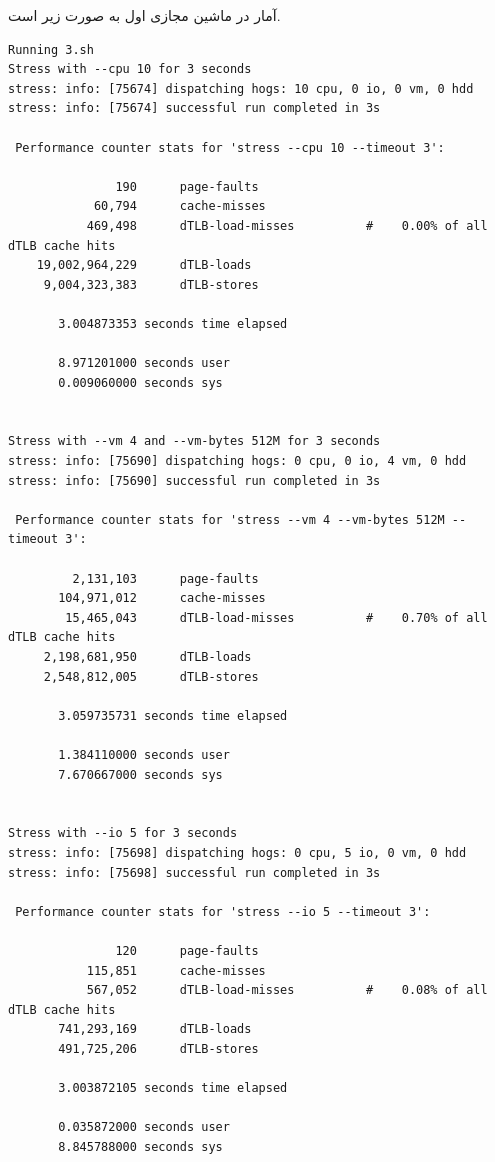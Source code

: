 \documentclass{article}
\begin{document}
آمار در ماشین مجازی اول به صورت زیر است.
\begin{latin}
\begin{lstlisting}
Running 3.sh
Stress with --cpu 10 for 3 seconds
stress: info: [75674] dispatching hogs: 10 cpu, 0 io, 0 vm, 0 hdd
stress: info: [75674] successful run completed in 3s

 Performance counter stats for 'stress --cpu 10 --timeout 3':

               190      page-faults                                                 
            60,794      cache-misses                                                
           469,498      dTLB-load-misses          #    0.00% of all dTLB cache hits 
    19,002,964,229      dTLB-loads                                                  
     9,004,323,383      dTLB-stores                                                 

       3.004873353 seconds time elapsed

       8.971201000 seconds user
       0.009060000 seconds sys


Stress with --vm 4 and --vm-bytes 512M for 3 seconds
stress: info: [75690] dispatching hogs: 0 cpu, 0 io, 4 vm, 0 hdd
stress: info: [75690] successful run completed in 3s

 Performance counter stats for 'stress --vm 4 --vm-bytes 512M --timeout 3':

         2,131,103      page-faults                                                 
       104,971,012      cache-misses                                                
        15,465,043      dTLB-load-misses          #    0.70% of all dTLB cache hits 
     2,198,681,950      dTLB-loads                                                  
     2,548,812,005      dTLB-stores                                                 

       3.059735731 seconds time elapsed

       1.384110000 seconds user
       7.670667000 seconds sys


Stress with --io 5 for 3 seconds
stress: info: [75698] dispatching hogs: 0 cpu, 5 io, 0 vm, 0 hdd
stress: info: [75698] successful run completed in 3s

 Performance counter stats for 'stress --io 5 --timeout 3':

               120      page-faults                                                 
           115,851      cache-misses                                                
           567,052      dTLB-load-misses          #    0.08% of all dTLB cache hits 
       741,293,169      dTLB-loads                                                  
       491,725,206      dTLB-stores                                                 

       3.003872105 seconds time elapsed

       0.035872000 seconds user
       8.845788000 seconds sys
\end{lstlisting}
\end{latin}
\end{document}
